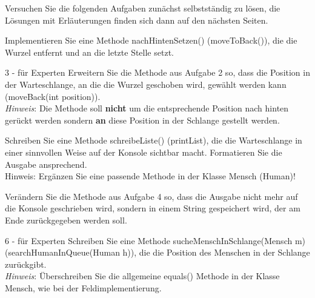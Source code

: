 \documentclass{article}
\begin{document}
Versuchen Sie die folgenden Aufgaben zunächst selbstständig zu lösen, die Lösungen mit Erläuterungen finden sich dann auf 
den nächsten Seiten.

\begin{task}{2}
Implementieren Sie eine Methode nachHintenSetzen() (moveToBack()), die die Wurzel entfernt und an die letzte
Stelle setzt.
\end{task}

\begin{task}{3 - für Experten}
Erweitern Sie die Methode aus Aufgabe 2 so, dass die Position in der Warteschlange, an die die Wurzel geschoben wird, gewählt werden kann (moveBack(int position)).\\
\textit{Hinweis}: Die Methode soll \textbf{nicht} um die entsprechende Position nach hinten gerückt werden sondern  \textbf{an} diese Position in der Schlange gestellt werden.
\end{task}

\begin{task}{4}
    Schreiben Sie eine Methode schreibeListe() (printList), die die Warteschlange in einer sinnvollen Weise 
    auf der Konsole sichtbar macht. Formatieren Sie die Ausgabe ansprechend. \\
    Hinweis: Ergänzen Sie eine passende Methode in der Klasse Mensch (Human)!
\end{task}

\begin{task}{5}
    Verändern Sie die Methode aus Aufgabe 4 so, dass die Ausgabe nicht mehr auf die Konsole geschrieben wird, 
    sondern in einem String gespeichert wird, der am Ende zurückgegeben werden soll. 
\end{task}

\begin{task}{6 - für Experten}
    Schreiben Sie eine Methode sucheMenschInSchlange(Mensch m) (searchHumanInQueue(Human h)), die die Position 
    des Menschen in der Schlange zurückgibt. \\
    \textit{Hinweis}: Überschreiben Sie die allgemeine equals() Methode in der Klasse Mensch, wie bei der
    Feldimplementierung.
\end{task}
\end{document}
